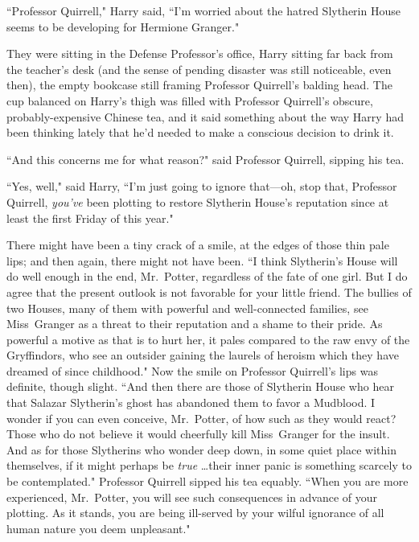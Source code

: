 \later

``Professor Quirrell," Harry said, ``I'm worried about the hatred Slytherin House seems to be developing for Hermione Granger."

They were sitting in the Defense Professor's office, Harry sitting far back from the teacher's desk (and the sense of pending disaster was still noticeable, even then), the empty bookcase still framing Professor Quirrell's balding head. The cup balanced on Harry's thigh was filled with Professor Quirrell's obscure, probably-expensive Chinese tea, and it said something about the way Harry had been thinking lately that he'd needed to make a conscious decision to drink it.

``And this concerns me for what reason?" said Professor Quirrell, sipping his tea.

``Yes, well," said Harry, ``I'm just going to ignore that—oh, stop that, Professor Quirrell, \emph{you've} been plotting to restore Slytherin House's reputation since at least the first Friday of this year."

There might have been a tiny crack of a smile, at the edges of those thin pale lips; and then again, there might not have been. ``I think Slytherin's House will do well enough in the end, Mr.~Potter, regardless of the fate of one girl. But I do agree that the present outlook is not favorable for your little friend. The bullies of two Houses, many of them with powerful and well-connected families, see Miss~Granger as a threat to their reputation and a shame to their pride. As powerful a motive as that is to hurt her, it pales compared to the raw envy of the Gryffindors, who see an outsider gaining the laurels of heroism which they have dreamed of since childhood." Now the smile on Professor Quirrell's lips was definite, though slight. ``And then there are those of Slytherin House who hear that Salazar Slytherin's ghost has abandoned them to favor a Mudblood. I wonder if you can even conceive, Mr.~Potter, of how such as they would react? Those who do not believe it would cheerfully kill Miss~Granger for the insult. And as for those Slytherins who wonder deep down, in some quiet place within themselves, if it might perhaps be \emph{true} {\ldots}their inner panic is something scarcely to be contemplated." Professor Quirrell sipped his tea equably. ``When you are more experienced, Mr.~Potter, you will see such consequences in advance of your plotting. As it stands, you are being ill-served by your wilful ignorance of all human nature you deem unpleasant."

